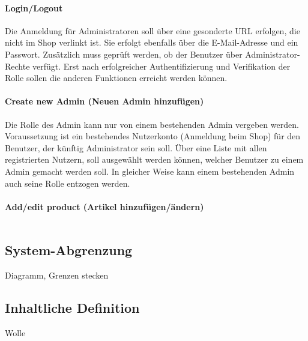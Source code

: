 \paragraph{Login/Logout}$\;$ \\
Die Anmeldung für Administratoren soll über eine gesonderte URL erfolgen, die nicht im Shop verlinkt ist.
Sie erfolgt ebenfalls über die E-Mail-Adresse und ein Passwort. Zusätzlich muss geprüft werden, ob der Benutzer über Administrator-Rechte verfügt.
Erst nach erfolgreicher Authentifizierung und Verifikation der Rolle sollen die anderen Funktionen erreicht werden können.
\paragraph{Create new Admin (Neuen Admin hinzufügen)}$\;$ \\
Die Rolle des Admin kann nur von einem bestehenden Admin vergeben werden.
Voraussetzung ist ein bestehendes Nutzerkonto (Anmeldung beim Shop) für den Benutzer, der künftig Administrator sein soll.
Über eine Liste mit allen registrierten Nutzern, soll ausgewählt werden können, welcher Benutzer zu einem Admin gemacht werden soll.
In gleicher Weise kann einem bestehenden Admin auch seine Rolle entzogen werden.
\paragraph{Add/edit product (Artikel hinzufügen/ändern)}$\;$ \\

\subsection{System-Abgrenzung}
Diagramm, Grenzen stecken
\subsection{Inhaltliche Definition}
Wolle